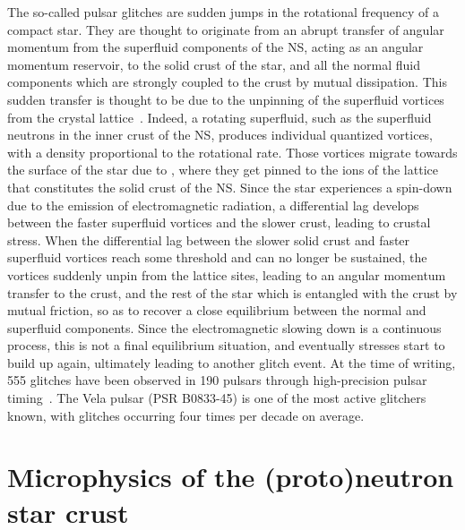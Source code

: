 The so-called pulsar glitches are sudden jumps in the rotational frequency of 
a compact star. They are thought to originate from an abrupt transfer of 
angular momentum from the superfluid components of the NS, acting as an angular 
momentum reservoir, to the solid crust of the star, and all the normal fluid
components which are strongly coupled to the crust by mutual dissipation. This
sudden transfer is thought to be due to the unpinning of the superfluid 
vortices from the crystal lattice~\cite{Anderson1975}. 
%
Indeed, a rotating superfluid, such as the superfluid neutrons in the inner 
crust of the NS, produces individual quantized vortices, with a density 
proportional to the rotational rate. Those vortices migrate towards the surface 
of the star due to , where 
they get pinned to the ions of the lattice that constitutes the solid 
crust of the NS. Since the star experiences a spin-down due to the emission of 
electromagnetic radiation, a differential lag develops between the faster 
superfluid vortices and the slower crust, leading to crustal stress. 
%
When the differential lag between the slower solid crust and faster superfluid 
vortices reach some threshold and can no longer be sustained, the vortices
suddenly unpin from the lattice sites, leading to an angular momentum transfer
to the crust, and the rest of the star which is entangled with the crust by
mutual friction, so as to recover a close equilibrium between the normal and
superfluid components. Since the electromagnetic slowing down is a continuous
process, this is not a final equilibrium situation, and eventually stresses 
start to build up again, ultimately leading to another glitch event.
%
At the time of writing, 555 glitches have been observed in 190 pulsars through 
high-precision pulsar timing~\cite{Espinoza2011,Glitches}. The Vela pulsar 
(PSR B0833-45) is one of the most active glitchers known, with glitches 
occurring four times per decade on average.

\section*{Microphysics of the (proto)neutron star crust}

